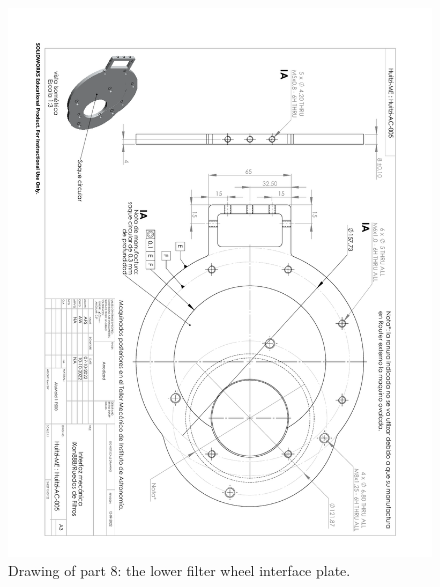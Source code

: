 \begin{figure}
\begin{center}
\includegraphics[angle=180,width=0.9\linewidth]{figures/huitzi-f20-part-8.pdf}
\end{center}
\caption{Drawing of part 8: the lower filter wheel interface plate.}
\label{figure:huitzi-f20-part-8}
\end{figure}

